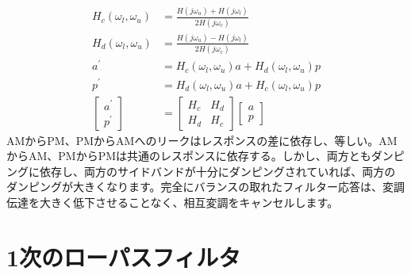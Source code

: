 \documentclass[article]{jlreq}
\begin{document}
%
\begin{align}
    H_c(\omega_l, \omega_u) & = \frac{H(j\omega_u)+H(j\omega_l)}{2H(j\omega_c)}       \\
    H_d(\omega_l, \omega_u) & = \frac{H(j\omega_u)-H(j\omega_l)}{2H(j\omega_c)}       \\
    a^{\prime}              & =   H_c(\omega_l, \omega_u)a + H_d(\omega_l, \omega_u)p \\
    p^{\prime}              & =   H_d(\omega_l, \omega_u)a + H_c(\omega_l, \omega_u)p \\
    \begin{bmatrix}
        a^{\prime} \\
        p^{\prime}
    \end{bmatrix}
                            & =
    \begin{bmatrix}
        H_c & H_d \\
        H_d & H_c
    \end{bmatrix}
    \begin{bmatrix}
        a \\
        p
    \end{bmatrix}
\end{align}
%
AMからPM、PMからAMへのリークはレスポンスの差に依存し、等しい。AMからAM、PMからPMは共通のレスポンスに依存する。しかし、両方ともダンピングに依存し、両方のサイドバンドが十分にダンピングされていれば、両方のダンピングが大きくなります。完全にバランスの取れたフィルター応答は、変調伝達を大きく低下させることなく、相互変調をキャンセルします。

\section{1次のローパスフィルタ}
\end{document}
